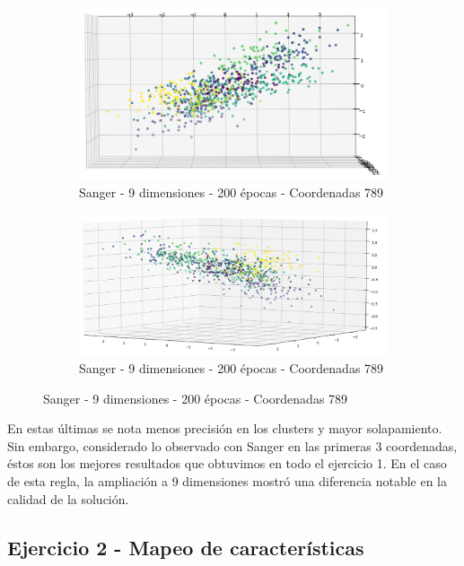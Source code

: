 \begin{figure}[!htbp]
\centering
\begin{subfigure}{.5\textwidth}
  \centering
  \includegraphics[width=1\linewidth, scale=1]{../img/ej1/sanger_corrida_200_9/sanger_9salida_200ep_testing_dim789_3.png}
  \caption{Sanger - 9 dimensiones - 200 épocas - Coordenadas 789}
  \label{fig:sub1}
\end{subfigure}%
\begin{subfigure}{.5\textwidth}
  \centering
  \includegraphics[width=1\linewidth, scale=1]{../img/ej1/sanger_corrida_200_9/sanger_9salida_200ep_testing_dim789_4.png}
  \caption{Sanger - 9 dimensiones - 200 épocas - Coordenadas 789}
  \label{fig:sub2}
\end{subfigure}
\end{figure}

En estas últimas se nota menos precisión en los clusters y mayor solapamiento. Sin embargo, considerado lo observado con Sanger en las primeras 3 coordenadas, éstos son los mejores
resultados que obtuvimos en todo el ejercicio 1. En el caso de esta regla, la ampliación a 9 dimensiones mostró una diferencia notable en la calidad de la solución.

\newpage
\subsection{Ejercicio 2 - Mapeo de características}

